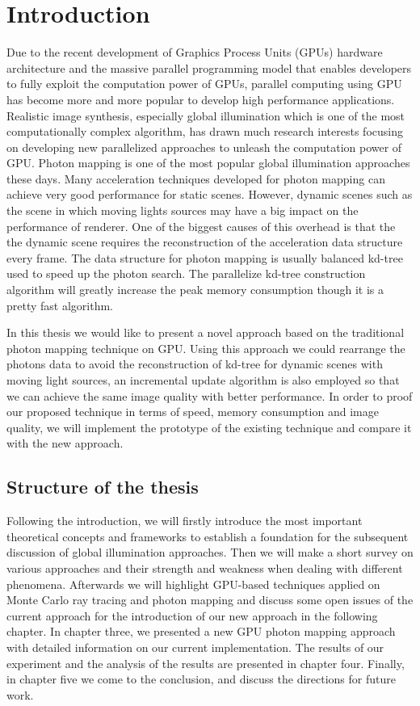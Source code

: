 \chapter{Introduction}

Due to the recent development of Graphics Process Units (GPUs) hardware architecture and the massive parallel programming model that enables developers to fully exploit the computation power of GPUs, parallel computing using GPU has become more and more popular to develop high performance applications. Realistic image synthesis, especially global illumination which is one of the most computationally complex algorithm, has drawn much research interests focusing on developing new parallelized approaches to unleash the computation power of GPU. Photon mapping is one of the most popular global illumination approaches these days. Many acceleration techniques developed for photon mapping can achieve very good performance for static scenes. However, dynamic scenes such as the scene in which moving lights sources may have a big impact on the performance of renderer. One of the biggest causes of this overhead is that the the dynamic scene requires the reconstruction of the acceleration data structure every frame. The data structure for photon mapping is usually balanced kd-tree \cite{Bentley:1975:MBS:361002.361007} used to speed up the photon search. The parallelize kd-tree construction algorithm will greatly increase the peak memory consumption though it is a pretty fast algorithm. 

In this thesis we would like to present a novel approach based on the traditional photon mapping technique on GPU.  Using this approach we could rearrange the photons data to avoid the reconstruction of kd-tree for dynamic scenes with moving light sources, an incremental update algorithm is also employed so that we can achieve the same image quality with better performance. In order to proof our proposed technique in terms of speed, memory consumption and image quality, we will implement the prototype of the existing technique and compare it with the new approach. 

\section{Structure of the thesis} 

Following the introduction, we will firstly introduce the most important theoretical concepts and frameworks to establish a foundation for the subsequent discussion of global illumination approaches. Then we will make a short survey on various approaches and their strength and weakness when dealing with different phenomena. Afterwards we will highlight GPU-based techniques applied on Monte Carlo ray tracing and photon mapping and discuss some open issues of the current approach for the introduction of our new approach in the following chapter.  In chapter three, we presented a new GPU photon mapping approach with detailed information on our current implementation. The results of our experiment and the analysis of the results are presented in chapter four. Finally, in chapter five we come to the conclusion, and discuss the directions for future work.
